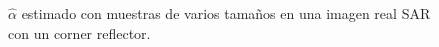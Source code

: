 \begin{figure}[htb]
	\caption{\label{reales3} $\widehat{\alpha}$ estimado con muestras de varios tamaños en una imagen real SAR con un corner reflector.}
\end{figure}



